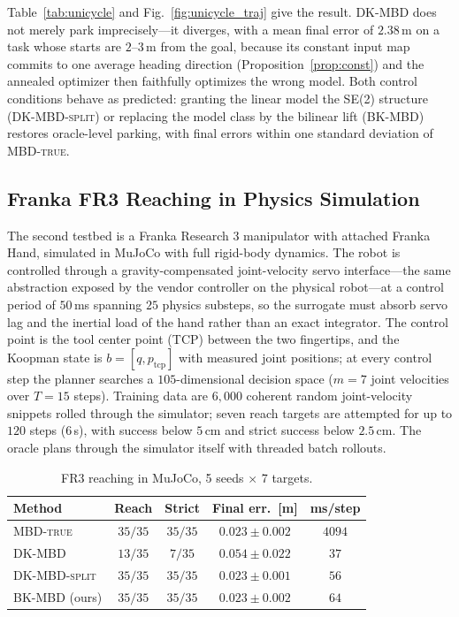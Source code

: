 \documentclass[lettersize,journal]{IEEEtran}
\theoremstyle{remark}
\newcommand{\mbdtrue}{\textsc{MBD-true}}
\newcommand{\dkmbd}{\textsc{DK-MBD}}
\newcommand{\dksplit}{\textsc{DK-MBD-split}}
\newcommand{\bkmbd}{\textsc{BK-MBD}}
\begin{document}
Table~\ref{tab:unicycle} and Fig.~\ref{fig:unicycle_traj} give the
result. \dkmbd{} does not merely park imprecisely---it diverges, with a
mean final error of $2.38$\,m on a task whose starts are $2$--$3$\,m from
the goal, because its constant input map commits to one average heading
direction (Proposition~\ref{prop:const}) and the annealed
optimizer then faithfully optimizes the wrong model. Both control
conditions behave as predicted: granting the linear model the SE(2)
structure (\dksplit{})
or replacing the model class by the bilinear lift (\bkmbd{}) restores
oracle-level parking, with final errors within one standard deviation of
\mbdtrue{}.

\subsection{Franka FR3 Reaching in Physics Simulation}\label{subsec:exp_franka}

The second testbed is a Franka
Research 3 manipulator with attached Franka Hand, simulated in MuJoCo with
full rigid-body dynamics. The robot is controlled through a
gravity-compensated joint-velocity servo interface---the same abstraction
exposed by the vendor controller on the physical robot---at a control
period of $50$\,ms spanning $25$ physics substeps, so the surrogate must
absorb servo lag and the inertial load of the hand rather than an exact
integrator. The control point is the tool center point (TCP) between the
two fingertips, and the Koopman state is $b = [q, p_{\mathrm{tcp}}]$ with
measured joint positions; at every control step the planner searches a
$105$-dimensional decision space ($m = 7$ joint velocities over
$T = 15$ steps). Training data are $6{,}000$ coherent random
joint-velocity snippets rolled through the simulator; seven reach targets
are attempted for up to $120$ steps ($6$\,s), with success below $5$\,cm
and strict success below $2.5$\,cm. The oracle plans through the simulator
itself with threaded batch rollouts.

\begin{table}[t]
\centering
\caption{FR3 reaching in MuJoCo, 5 seeds $\times$ 7 targets.}
\label{tab:franka}
\begin{tabular}{lcccc}
\hline
Method & Reach & Strict & Final err.\ [m] & ms/step \\
\hline
\mbdtrue{} & $35/35$ & $35/35$ & $0.023 \pm 0.002$ & $4094$ \\
\dkmbd{} & $13/35$ & $7/35$ & $0.054 \pm 0.022$ & $37$ \\
\dksplit{} & $35/35$ & $35/35$ & $0.023 \pm 0.001$ & $56$ \\
\bkmbd{} (ours) & $35/35$ & $35/35$ & $0.023 \pm 0.002$ & $64$ \\
\hline
\end{tabular}
\end{table}
\end{document}
